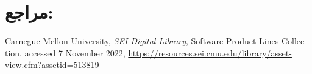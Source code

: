 {\begin{enumerate}
\end{enumerate}

\section*{مراجع:}

\begin{latin}
	\begingroup
	\renewcommand{\section}[2]{}%
	
\begin{thebibliography}{9}

	Carnegue Mellon University,
	\textit{SEI Digital Library},
	Software Product Lines Collection, 
	accessed 7 November 2022,
	\url{https://resources.sei.cmu.edu/library/asset-view.cfm?assetid=513819}
	
\end{thebibliography}
\endgroup
\end{latin}







}